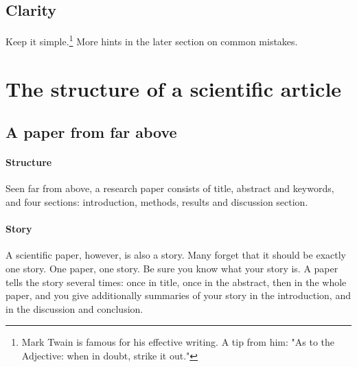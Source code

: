 \documentclass{tufte-book}
\begin{document}
\subsection{Clarity}

Keep it simple.\footnote{Mark Twain is famous for his effective writing. A tip from him: "As to the Adjective: when in doubt, strike it out."} More hints in the later section on common mistakes.

\section{The structure of a scientific article}   

\subsection{A paper from far above}

\paragraph{Structure}Seen far from above, a research paper consists of title, abstract and keywords, and four sections: introduction, methods, results and discussion section. 

\paragraph{Story}A scientific paper, however, is also a story. Many forget that it should be exactly one story. One paper, one story. Be sure you know what your story is. A paper tells the story several times: once in title, once in the abstract, then in the whole paper, and you give additionally summaries of your story in the introduction, and in the discussion and  conclusion.

\end{document}
